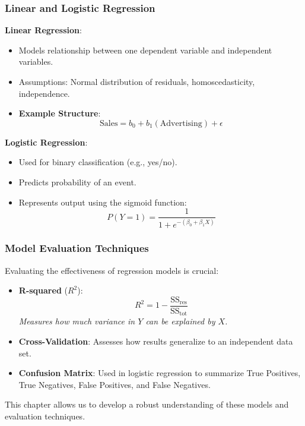 \documentclass[aspectratio=169]{beamer}
\begin{document}
\begin{frame}[fragile]
    \frametitle{Linear and Logistic Regression}
    \textbf{Linear Regression}:
    \begin{itemize}
        \item Models relationship between one dependent variable and independent variables.
        \item Assumptions: Normal distribution of residuals, homoscedasticity, independence.
        \item \textbf{Example Structure}:
        \begin{equation}
            \text{Sales} = b_0 + b_1(\text{Advertising}) + \epsilon
        \end{equation}
    \end{itemize}

    \textbf{Logistic Regression}:
    \begin{itemize}
        \item Used for binary classification (e.g., yes/no).
        \item Predicts probability of an event.
        \item Represents output using the sigmoid function:
        \begin{equation}
            P(Y=1) = \frac{1}{1 + e^{-(\beta_0 + \beta_1X)}}
        \end{equation}
    \end{itemize}
\end{frame}

\begin{frame}[fragile]
    \frametitle{Model Evaluation Techniques}
    Evaluating the effectiveness of regression models is crucial:

    \begin{itemize}
        \item \textbf{R-squared} (\(R^2\)): 
        \begin{equation}
            R^2 = 1 - \frac{\text{SS}_{\text{res}}}{\text{SS}_{\text{tot}}}
        \end{equation}
        \textit{Measures how much variance in \(Y\) can be explained by \(X\).}

        \item \textbf{Cross-Validation}: Assesses how results generalize to an independent data set.
        
        \item \textbf{Confusion Matrix}: Used in logistic regression to summarize True Positives, True Negatives, False Positives, and False Negatives.
    \end{itemize}

    This chapter allows us to develop a robust understanding of these models and evaluation techniques.
\end{frame}
\end{document}
